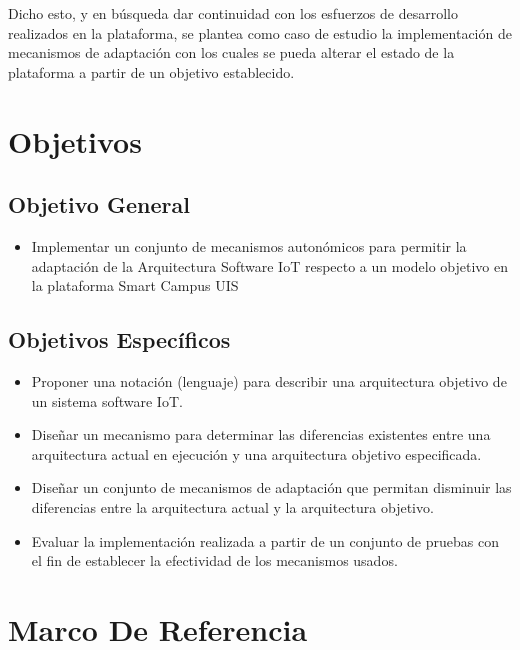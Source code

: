 \documentclass[12pt]{article}
\begin{document}
    Dicho esto, y en búsqueda dar continuidad con los esfuerzos de desarrollo realizados en la plataforma, se plantea como caso de estudio la implementación de mecanismos de adaptación con los cuales se pueda alterar el estado de la plataforma a partir de un objetivo establecido.  

    \pagebreak

    \section{Objetivos}
    \subsection{Objetivo General}
    \begin{itemize}

        \item Implementar un conjunto de mecanismos autonómicos para permitir la adaptación de la Arquitectura Software IoT respecto a un modelo objetivo en la plataforma Smart Campus UIS

    \end{itemize}

    \subsection{Objetivos Específicos}

    \begin{itemize}
        \item Proponer una notación (lenguaje) para describir una arquitectura objetivo de un sistema software IoT.
        \item Diseñar un mecanismo para determinar las diferencias existentes entre una arquitectura actual en ejecución y una arquitectura objetivo especificada.
        \item Diseñar un conjunto de mecanismos de adaptación que permitan disminuir las diferencias entre la arquitectura actual y la arquitectura objetivo.
        \item Evaluar la implementación realizada a partir de un conjunto de pruebas con el fin de establecer la efectividad de los mecanismos usados.

    \end{itemize}

    \pagebreak

    \section{Marco De Referencia}
\end{document}
